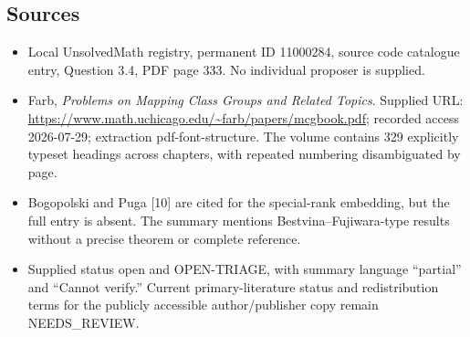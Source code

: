 \documentclass[11pt]{article}
\begin{document}
\subsection{Sources}
\begin{itemize}
\item Local UnsolvedMath registry, permanent ID 11000284, source code catalogue entry, Question 3.4, PDF page 333. No individual proposer is supplied.
\item Farb, \emph{Problems on Mapping Class Groups and Related Topics}. Supplied URL: \url{https://www.math.uchicago.edu/~farb/papers/mcgbook.pdf}; recorded access 2026-07-29; extraction pdf-font-structure. The volume contains 329 explicitly typeset headings across chapters, with repeated numbering disambiguated by page.
\item Bogopolski and Puga [10] are cited for the special-rank embedding, but the full entry is absent. The summary mentions Bestvina--Fujiwara-type results without a precise theorem or complete reference.
\item Supplied status open and OPEN-TRIAGE, with summary language ``partial'' and ``Cannot verify.'' Current primary-literature status and redistribution terms for the publicly accessible author/publisher copy remain NEEDS\_REVIEW.
\end{itemize}
\end{document}

